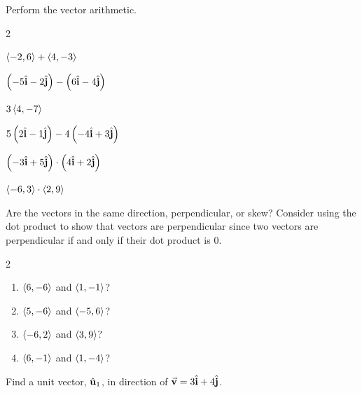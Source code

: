 \begin{myPractice}
	Perform the vector arithmetic.
	\begin{enumerate}
	\end{enumerate}
\end{myPractice}
\vfill
\newpage
\begin{myPractice}
	Are the vectors in the same direction, perpendicular, or skew? Consider using the dot product to show that vectors are perpendicular since two vectors are perpendicular if and only if their dot product is $0$.
	\begin{multicols}{2}
		\begin{enumerate}[itemsep=1cm]
			\item $\left\langle 6,-6 \right\rangle$ and $\left\langle 1,-1 \right\rangle$?
			\item $\left\langle 5,-6 \right\rangle$ and $\left\langle -5,6 \right\rangle$?
			\item $\left\langle -6,2 \right\rangle$ and $\left\langle 3,9 \right\rangle$?
			\item $\left\langle 6,-1 \right\rangle$ and $\left\langle 1,-4 \right\rangle$?
		\end{enumerate}
	\end{multicols}
\end{myPractice}
\vspace{1cm}
\begin{myPractice}
		Find a unit vector, $\hat{\textbf{u}}_1$, in direction of $\vec{\textbf{v}}=3\hat{\textbf{i}}+4\hat{\textbf{j}}$.
		\vfill
\end{myPractice}

